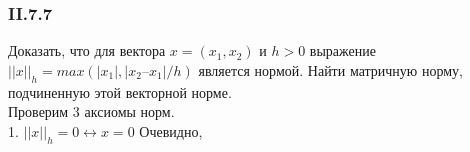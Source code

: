 \subsubsection*{II.7.7}
Доказать,  что  для  вектора  $x = (x_1,x_2)$  и $h > 0$  выражение $||x||_h = max(|x_1|, |x_2 – x_1|/h)$ является нормой. Найти матричную норму, подчиненную этой векторной норме.\\
Проверим 3 аксиомы норм.\\
1. $||x||_h = 0 \leftrightarrow x = 0$
Очевидно,